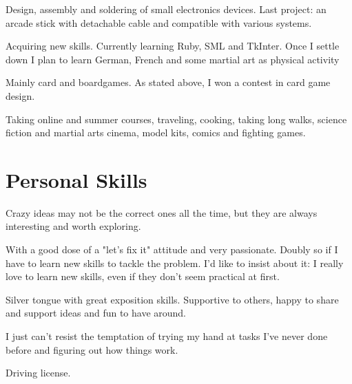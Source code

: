 \documentclass[11pt,a4paper,roman]{moderncv}
\begin{document}
	{Design, assembly and soldering of small electronics devices. Last project: an arcade stick with detachable cable and compatible with various systems.}

	{Acquiring new skills. Currently learning Ruby, SML and TkInter.
	Once I settle down I plan to learn German, French and some martial art as physical activity}

	{Mainly card and boardgames. As stated above, I won a contest in card game design.}

	{Taking online and summer courses, traveling, cooking, taking long walks, science fiction and martial arts cinema, model kits, comics and fighting games.}



\section{Personal Skills}

{Crazy ideas may not be the correct ones all the time, but they are always interesting and worth exploring.}

{With a good dose of a "let's fix it" attitude and very passionate. Doubly so if I have to learn new skills to tackle the problem. I'd like to insist about it: I really love to learn new skills, even if they don't seem practical at first.}

{Silver tongue with great exposition skills. Supportive to others, happy to share and support ideas and fun to have around.}

{I just can't resist the temptation of trying my hand at tasks I've never done before and figuring out how things work.}


{Driving license.}


\renewcommand{\listitemsymbol}{-~}            %
\end{document}
